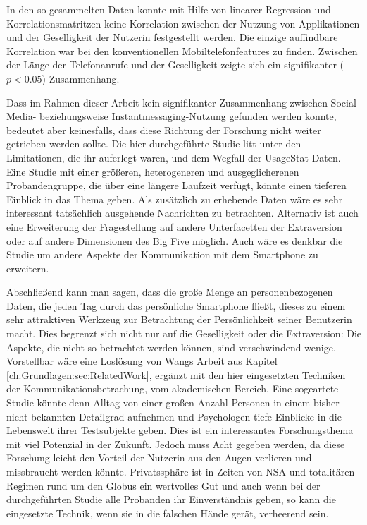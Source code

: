 \par
In den so gesammelten Daten konnte mit Hilfe von linearer Regression und Korrelationsmatritzen keine Korrelation zwischen der Nutzung von Applikationen und der Geselligkeit der Nutzerin festgestellt werden. 
Die einzige auffindbare Korrelation war bei den konventionellen Mobiltelefonfeatures zu finden.
Zwischen der Länge der Telefonanrufe und der Geselligkeit zeigte sich ein signifikanter ($p < 0.05$) Zusammenhang.
\par
Dass im Rahmen dieser Arbeit kein signifikanter Zusammenhang zwischen Social Media- beziehungsweise Instantmessaging-Nutzung gefunden werden konnte, bedeutet aber keinesfalls,
dass diese Richtung der Forschung nicht weiter getrieben werden sollte.
Die hier durchgeführte Studie litt unter den Limitationen, die ihr auferlegt waren, und dem Wegfall der UsageStat Daten.
Eine Studie mit einer größeren, heterogeneren und ausgeglicherenen Probandengruppe, die über eine längere Laufzeit verfügt, könnte einen tieferen Einblick in das Thema geben.
Als zusätzlich zu erhebende Daten wäre es sehr interessant tatsächlich ausgehende Nachrichten zu betrachten.
Alternativ ist auch eine Erweiterung der Fragestellung auf andere Unterfacetten der Extraversion oder auf andere Dimensionen des Big Five möglich.
Auch wäre es denkbar die Studie um andere Aspekte der Kommunikation mit dem Smartphone zu erweitern.
\par
Abschließend kann man sagen, dass die große Menge an personenbezogenen Daten,
die jeden Tag durch das persönliche Smartphone fließt, dieses zu einem sehr attraktiven Werkzeug zur Betrachtung der Persönlichkeit seiner Benutzerin macht.
Dies begrenzt sich nicht nur auf die Geselligkeit oder die Extraversion: 
Die Aspekte, die nicht so betrachtet werden können, sind verschwindend wenige.
Vorstellbar wäre eine Loslösung von Wangs Arbeit aus Kapitel \ref{ch:Grundlagen:sec:RelatedWork}, ergänzt mit den hier eingesetzten Techniken der Kommunikationsbetrachung, vom akademischen Bereich.
Eine sogeartete Studie könnte denn Alltag von einer großen Anzahl Personen in einem bisher nicht bekannten Detailgrad aufnehmen und Psychologen tiefe Einblicke in die Lebenswelt ihrer Testsubjekte geben.
Dies ist ein interessantes Forschungsthema mit viel Potenzial in der Zukunft.
Jedoch muss Acht gegeben werden, da
diese Forschung leicht den Vorteil der Nutzerin aus den Augen verlieren und missbraucht werden könnte. 
Privatssphäre ist in Zeiten von NSA und totalitären Regimen rund um den Globus ein wertvolles Gut und auch wenn bei der durchgeführten Studie alle Probanden ihr Einverständnis geben, so kann die eingesetzte Technik, wenn sie in die falschen Hände gerät, verheerend sein.


